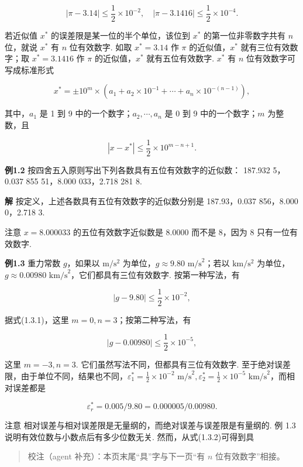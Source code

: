 \[
|\pi - 3.14| \leqslant \frac{1}{2} \times 10^{-2}, \quad |\pi - 3.1416| \leqslant \frac{1}{2} \times 10^{-4}.
\]

若近似值 \(x^*\) 的误差限是某一位的半个单位，该位到 \(x^*\) 的第一位非零数字共有 \(n\) 位，就说 \(x^*\) 有 \(n\) 位有效数字. 如取 \(x^* = 3.14\) 作 \(\pi\) 的近似值，\(x^*\) 就有三位有效数字；取 \(x^* = 3.1416\) 作 \(\pi\) 的近似值，\(x^*\) 就有五位有效数字. \(x^*\) 有 \(n\) 位有效数字可写成标准形式

\[
x^* = \pm 10^m \times (a_1 + a_2 \times 10^{-1} + \cdots + a_n \times 10^{-(n-1)}), \tag{1.3.1}
\]

其中，\(a_1\) 是 1 到 9 中的一个数字；\(a_2, \cdots, a_n\) 是 0 到 9 中的一个数字；\(m\) 为整数，且

\[
|x - x^*| \leqslant \frac{1}{2} \times 10^{m-n+1}. \tag{1.3.2}
\]

\textbf{例1.2} 按四舍五入原则写出下列各数具有五位有效数字的近似数： 187.932 5，0.037 855 51，8.000 033，2.718 281 8.

\textbf{解} 按定义，上述各数具有五位有效数字的近似数分别是 187.93，0.037 856，8.000 0，2.718 3.

注意 \(x = 8.000033\) 的五位有效数字近似数是 8.0000 而不是 8，因为 8 只有一位有效数字.

\textbf{例1.3} 重力常数 \(g\)，如果以 \(\mathrm{m/s^2}\) 为单位，\(g \approx 9.80 \text{ m/s}^2\)；若以 \(\mathrm{km/s^2}\) 为单位，\(g \approx 0.00980 \text{ km/s}^2\)，它们都具有三位有效数字. 按第一种写法，有

\[
|g - 9.80| \leqslant \frac{1}{2} \times 10^{-2},
\]

据式(1.3.1)，这里 \(m=0, n=3\)；按第二种写法，有

\[
|g - 0.00980| \leqslant \frac{1}{2} \times 10^{-5},
\]

这里 \(m=-3, n=3\). 它们虽然写法不同，但都具有三位有效数字. 至于绝对误差限，由于单位不同，结果也不同，\(\varepsilon_1^* = \frac{1}{2} \times 10^{-2} \text{ m/s}^2, \varepsilon_2^* = \frac{1}{2} \times 10^{-5} \text{ km/s}^2\)，而相对误差都是

\[
\varepsilon_r^* = 0.005/9.80 = 0.000005/0.00980.
\]

注意 相对误差与相对误差限是无量纲的，而绝对误差与误差限是有量纲的. 例 1.3 说明有效位数与小数点后有多少位数无关. 然而，从式(1.3.2)可得到具

\begin{quote}
校注（agent 补充）：本页末尾``具''字与下一页``有 \(n\) 位有效数字''相接。
\end{quote}

